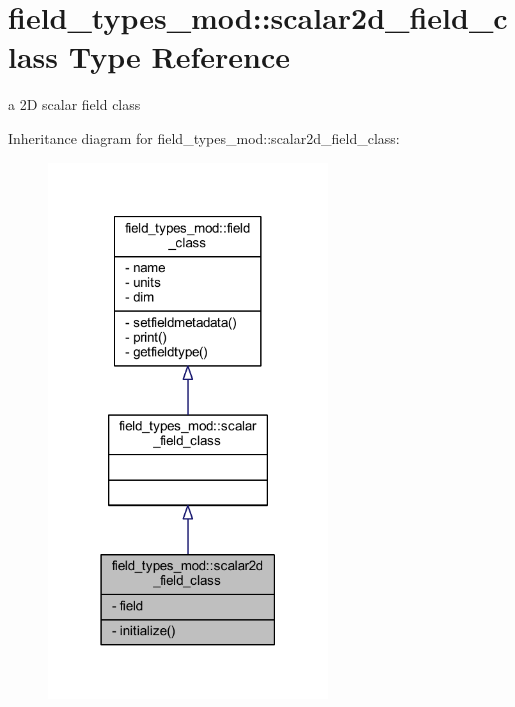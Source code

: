 \hypertarget{structfield__types__mod_1_1scalar2d__field__class}{}\section{field\+\_\+types\+\_\+mod\+:\+:scalar2d\+\_\+field\+\_\+class Type Reference}
\label{structfield__types__mod_1_1scalar2d__field__class}


a 2D scalar field class  




Inheritance diagram for field\+\_\+types\+\_\+mod\+:\+:scalar2d\+\_\+field\+\_\+class\+:\nopagebreak
\begin{figure}[H]
\begin{center}
\leavevmode
\includegraphics[width=210pt]{structfield__types__mod_1_1scalar2d__field__class__inherit__graph}
\end{center}
\end{figure}


